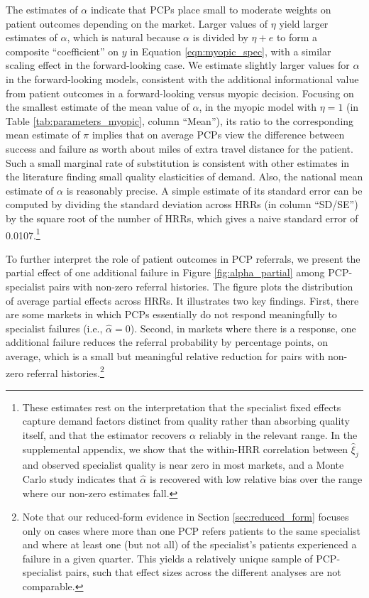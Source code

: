 \documentclass[12pt]{article}
\begin{document}
The estimates of $\alpha$ indicate that PCPs place small to moderate weights on patient outcomes depending on the market. Larger values of $\eta$ yield larger estimates of $\alpha$, which is natural because $\alpha$ is divided by $\eta + e$ to form a composite ``coefficient'' on $y$ in Equation \eqref{eqn:myopic_spec}, with a similar scaling effect in the forward-looking case. We estimate slightly larger values for $\alpha$ in the forward-looking models, consistent with the additional informational value from patient outcomes in a forward-looking versus myopic decision. Focusing on the smallest estimate of the mean value of $\alpha$, in the myopic model with $\eta = 1$ (in Table \ref{tab:parameters_myopic}, column ``Mean''), its ratio to the corresponding mean estimate of $\pi$ implies that on average PCPs view the difference between success and failure as worth about \alphaDistRatioMyopic{} miles of extra travel distance for the patient. Such a small marginal rate of substitution is consistent with other estimates in the literature finding small quality elasticities of demand. Also, the national mean estimate of $\alpha$ is reasonably precise. A simple estimate of its standard error can be computed by dividing the standard deviation across HRRs (in column ``SD/SE'') by the square root of the number of HRRs, which gives a naive standard error of 0.0107.\footnote{These estimates rest on the interpretation that the specialist fixed effects capture demand factors distinct from quality rather than absorbing quality itself, and that the estimator recovers $\alpha$ reliably in the relevant range. In the supplemental appendix, we show that the within-HRR correlation between $\hat\xi_j$ and observed specialist quality is near zero in most markets, and a Monte Carlo study indicates that $\hat\alpha$ is recovered with low relative bias over the range where our non-zero estimates fall.}

To further interpret the role of patient outcomes in PCP referrals, we present the partial effect of one additional failure in Figure \ref{fig:alpha_partial} among PCP-specialist pairs with non-zero referral histories. The figure plots the distribution of average partial effects across HRRs. It illustrates two key findings. First, there are some markets in which PCPs essentially do not respond meaningfully to specialist failures (i.e., $\hat \alpha = 0$). Second, in markets where there is a response, one additional failure reduces the referral probability by \partialFXNonzeroMyopic{} percentage points, on average, which is a small but meaningful relative reduction for pairs with non-zero referral histories.\footnote{Note that our reduced-form evidence in Section \ref{sec:reduced_form} focuses only on cases where more than one PCP refers patients to the same specialist and where at least one (but not all) of the specialist's patients experienced a failure in a given quarter. This yields a relatively unique sample of PCP-specialist pairs, such that effect sizes across the different analyses are not comparable.}
\end{document}
